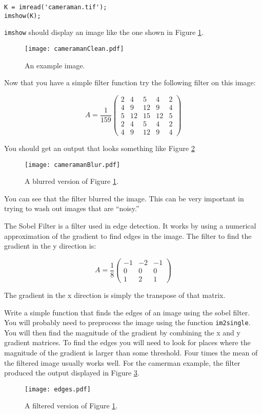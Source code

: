 \begin{verbatim}
K = imread('cameraman.tif');
imshow(K);
\end{verbatim}

{\tt imshow} should display an image like the one shown in Figure \ref{imfil:camclean}.

\begin{figure}
\texttt{[image: cameramanClean.pdf]}
\caption{An example image.}
\label{imfil:camclean}
\end{figure}

Now that you have a simple filter function try the following filter on this image:

\[
A = \frac{1}{159}\begin{pmatrix}
2&4&5&4&2\\
4&9&12&9&4\\
5&12&15&12&5\\
2&4&5&4&2\\
4&9&12&9&4
\end{pmatrix}
\]

You should get an output that looks something like Figure \ref{imfil:camblur}

\begin{figure}
\texttt{[image: cameramanBlur.pdf]}
\caption{A blurred version of Figure \ref{imfil:camclean}.}
\label{imfil:camblur}
\end{figure}

You can see that the filter blurred the image. This can be very important in trying to wash out images that are ``noisy.''

\begin{problem}

The Sobel Filter is a filter used in edge detection. It works by using a numerical approximation of the gradient to find edges in the image. The filter to find the gradient in the y direction is:

\[
A = \frac{1}{8}\begin{pmatrix}
-1&-2&-1\\
0&0&0\\
1&2&1
\end{pmatrix}
\]

The gradient in the x direction is simply the transpose of that matrix.

Write a simple function that finds the edges of an image using the sobel filter.
You will probably need to preprocess the image using the function {\tt im2single}.
You will then find the magnitude of the gradient by combining the x and y gradient matrices.
To find the edges you will need to look for places where the magnitude of the gradient is larger than some threshold.
Four times the mean of the filtered image usually works well.
For the camerman example, the filter produced the output displayed in Figure \ref{imfil:edges}.
\end{problem}

\begin{figure}[h!]
\texttt{[image: edges.pdf]}
\caption{A filtered version of Figure \ref{imfil:camclean}.}
\label{imfil:edges}
\end{figure}
